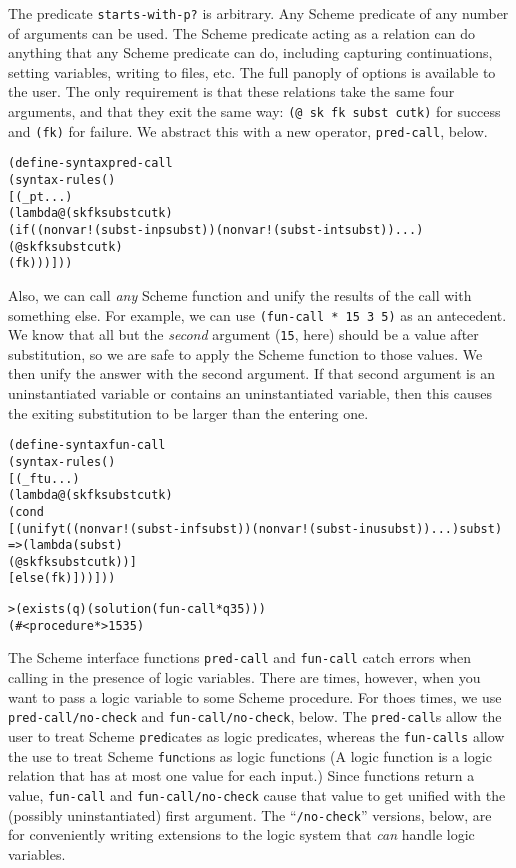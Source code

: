The predicate \texttt{starts-with-p?} is arbitrary.  Any Scheme
predicate of any number of arguments can be used.  The Scheme
predicate acting as a relation can do anything that any Scheme
predicate can do, including capturing continuations, setting
variables, writing to files, etc.  The full panoply of options is
available to the user.  The only requirement is that these relations
take the same four arguments, and that they exit the same way:
\texttt{(@ sk fk subst cutk)} for success and \texttt{(fk)} for
failure. We abstract this with a new operator, \texttt{pred-call},
below.

\begin{alltt}
(define-syntax pred-call
  (syntax-rules ()
    [(_ p t ...)
     (lambda@ (sk fk subst cutk)
       (if ((nonvar! (subst-in p subst)) (nonvar! (subst-in t subst)) ...)
         (@ sk fk subst cutk)
         (fk)))]))
\end{alltt}

Also, we can call \emph{any} Scheme function and unify the results of
the call with something else.  For example, we can use
\texttt{(fun-call * 15 3 5)} as an antecedent.  We know that all but
the \emph{second} argument (\texttt{15}, here) should be a value after
substitution, so we are safe to apply the Scheme function to those
values.  We then unify the answer with the second argument.  If that
second argument is an uninstantiated variable or contains an
uninstantiated variable, then this causes the exiting substitution to
be larger than the entering one.

\begin{alltt}
(define-syntax fun-call
  (syntax-rules ()
    [(_ f t u ...)
     (lambda@ (sk fk subst cutk)
       (cond
         [(unify t ((nonvar! (subst-in f subst)) (nonvar! (subst-in u subst)) ...) subst)
          => (lambda (subst)
               (@ sk fk subst cutk))]
         [else (fk)]))]))
\end{alltt}

\begin{alltt}
> (exists (q) (solution (fun-call * q 3 5)))
(#<procedure *> 15 3 5)
\end{alltt}

The Scheme interface functions \texttt{pred-call} and
\texttt{fun-call} catch errors when calling in the presence of logic
variables.  There are times, however, when you want to pass a logic
variable to some Scheme procedure.  For thoes times, we use
\texttt{pred-call/no-check} and \texttt{fun-call/no-check}, below.
The \texttt{pred-call}s allow the user to treat Scheme
\texttt{pred}icates as logic predicates, whereas the
\texttt{fun-calls} allow the use to treat Scheme \texttt{fun}ctions as
logic functions (A logic function is a logic relation that has at most
one value for each input.)  Since functions return a value,
\texttt{fun-call} and \texttt{fun-call/no-check} cause that value to
get unified with the (possibly uninstantiated) first argument.  The
``\texttt{/no-check}'' versions, below, are for conveniently writing
extensions to the logic system that \emph{can} handle logic variables.

